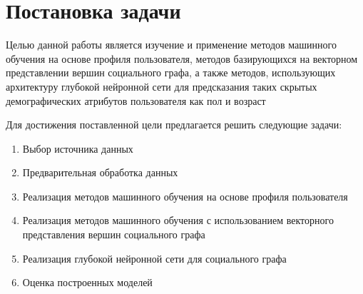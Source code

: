 \section{Постановка задачи}

Целью данной работы является изучение и применение методов машинного обучения на основе профиля пользователя, методов базирующихся на векторном представлении вершин социального графа, а также методов, использующих архитектуру глубокой нейронной сети для предсказания таких скрытых демографических атрибутов пользователя как пол и возраст 

Для достижения поставленной цели предлагается решить следующие задачи:

\begin{enumerate}
\item Выбор источника данных
\item Предварительная обработка данных
\item Реализация методов машинного обучения на основе профиля пользователя
\item Реализация методов машинного обучения с использованием векторного представления вершин социального графа
\item Реализация глубокой нейронной сети для социального графа
\item Оценка построенных моделей
\end{enumerate}

\clearpage